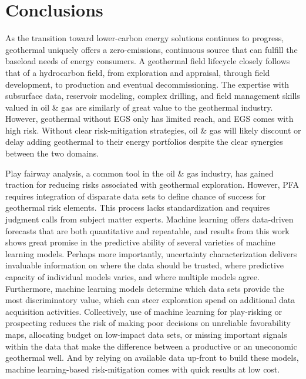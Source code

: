 \chapter{Conclusions}
\label{ch8:conclusions}

As the transition toward lower-carbon energy solutions continues to progress, geothermal uniquely offers a zero-emissions, continuous source that can fulfill the baseload needs of energy consumers. A geothermal field lifecycle closely follows that of a hydrocarbon field, from exploration and appraisal, through field development, to production and eventual decommissioning. The expertise with subsurface data, reservoir modeling, complex drilling, and field management skills valued in oil \& gas are similarly of great value to the geothermal industry. However, geothermal without EGS only has limited reach, and EGS comes with high risk. Without clear risk-mitigation strategies, oil \& gas will likely discount or delay adding geothermal to their energy portfolios despite the clear synergies between the two domains.

Play fairway analysis, a common tool in the oil \& gas industry, has gained traction for reducing risks associated with geothermal exploration. However, PFA requires integration of disparate data sets to define chance of success for geothermal risk elements. This process lacks standardization and requires judgment calls from subject matter experts. Machine learning offers data-driven forecasts that are both quantitative and repeatable, and results from this work shows great promise in the predictive ability of several varieties of machine learning models. Perhaps more importantly, uncertainty characterization delivers invaluable information on where the data should be trusted, where predictive capacity of individual models varies, and where multiple models agree. Furthermore, machine learning models determine which data sets provide the most discriminatory value, which can steer exploration spend on additional data acquisition activities. Collectively, use of machine learning for play-risking or prospecting reduces the risk of making poor decisions on unreliable favorability maps, allocating budget on low-impact data sets, or missing important signals within the data that make the difference between a productive or an uneconomic geothermal well. And by relying on available data up-front to build these models, machine learning-based risk-mitigation comes with quick results at low cost.

